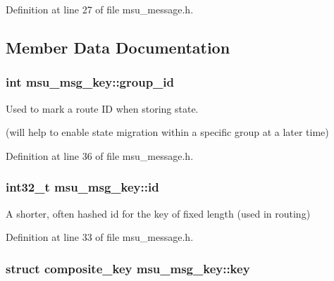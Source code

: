 Definition at line 27 of file msu\-\_\-message.\-h.



\subsection{Member Data Documentation}
\hypertarget{structmsu__msg__key_abd3cdf7b3585111dd56ca9ceba361dba}{
\subsubsection[{group\-\_\-id}]{\setlength{\rightskip}{0pt plus 5cm}int msu\-\_\-msg\-\_\-key\-::group\-\_\-id}}\label{structmsu__msg__key_abd3cdf7b3585111dd56ca9ceba361dba}


Used to mark a route I\-D when storing state. 

(will help to enable state migration within a specific group at a later time) 

Definition at line 36 of file msu\-\_\-message.\-h.

\hypertarget{structmsu__msg__key_afb9b6ad4c4a66b7c984e54e508073976}{
\subsubsection[{id}]{\setlength{\rightskip}{0pt plus 5cm}int32\-\_\-t msu\-\_\-msg\-\_\-key\-::id}}\label{structmsu__msg__key_afb9b6ad4c4a66b7c984e54e508073976}


A shorter, often hashed id for the key of fixed length (used in routing) 



Definition at line 33 of file msu\-\_\-message.\-h.

\hypertarget{structmsu__msg__key_ad443ba50619f77048500191f4296571e}{
\subsubsection[{key}]{\setlength{\rightskip}{0pt plus 5cm}struct {\bf composite\-\_\-key} msu\-\_\-msg\-\_\-key\-::key}}\label{structmsu__msg__key_ad443ba50619f77048500191f4296571e}


